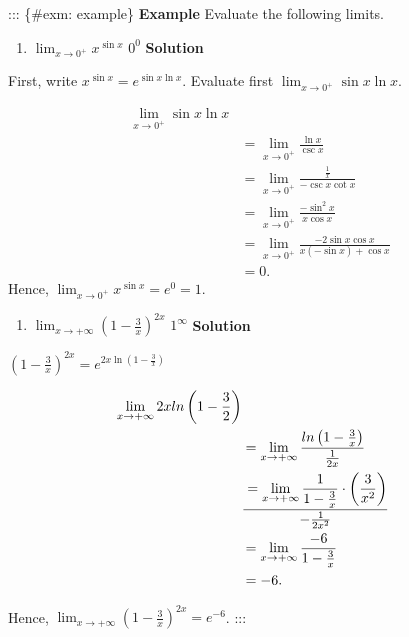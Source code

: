 \documentclass[
  letterpaper,
  DIV=11,
  numbers=noendperiod]{scrartcl}
\providecommand{\tightlist}{%
  \setlength{\itemsep}{0pt}\setlength{\parskip}{0pt}}\usepackage{longtable,booktabs,array}
\begin{document}
::: \{\#exm: example\} \textbf{Example} Evaluate the following limits.

\begin{enumerate}
\def\labelenumi{\arabic{enumi}.}
\tightlist
\item
  \(\displaystyle\lim_{x\to 0^+}{x^{\sin x}}\) \(0^0\) \textbf{Solution}
\end{enumerate}

First, write \(x^{\sin x}=e^{\sin x \ln x}\). Evaluate first
\(\displaystyle\lim_{x\to 0^+}{\sin x \ln x}\).

\[
\begin{aligned}
\displaystyle\lim_{x\to 0^+}{\sin x \ln x}\\&=\displaystyle\lim_{x\to 0^+}{\frac{\ln x}{\csc x}}\\&=\displaystyle\lim_{x\to 0^+}{\frac{\frac{1}{x}}{-\csc x \cot x}}\\&=\displaystyle\lim_{x\to 0^+}{\frac{-\sin^2 x}{x \cos x}}\\&=\displaystyle\lim_{x\to 0^+}{\frac{-2\sin x \cos x}{x(-\sin x)+\cos x}}\\&=0.
\end{aligned}
\] Hence, \(\displaystyle\lim_{x\to 0^+}{x^{\sin x}}=e^0=1\).

\begin{enumerate}
\def\labelenumi{\arabic{enumi}.}
\setcounter{enumi}{1}
\tightlist
\item
  \(\displaystyle\lim_{x\to +\infty}{\left(1-\frac{3}{x}\right)^{2x}}\)
  \(1^\infty\) \textbf{Solution}
\end{enumerate}

\(\left(1-\frac{3}{x}\right)^{2x}=e^{2x\ln \left(1-\frac{3}{x}\right)}\)

\[
\begin{aligned}
\displaystyle\lim_{x\to +\infty}{2x ln \left(1-\frac{3}{2}\right)}\\&=\displaystyle\lim_{x\to +\infty}{\frac{ln \left(1-\frac{3}{x}\right)}{\frac{1}{2x}}}\\&=\displaystyle\lim_{x\to +\infty}{\frac{1}{1-\frac{3}{x}}}\cdot \left(\frac{3}{x^2}\right)\over-\frac{1}{2x^2}\\&=\displaystyle\lim_{x\to +\infty}{\frac{-6}{1-\frac{3}{x}}}\\&=-6.
\end{aligned}
\]

Hence,
\(\displaystyle\lim_{x\to +\infty}{\left(1-\frac{3}{x}\right)^{2x}}=e^{-6}\).
:::
\end{document}

